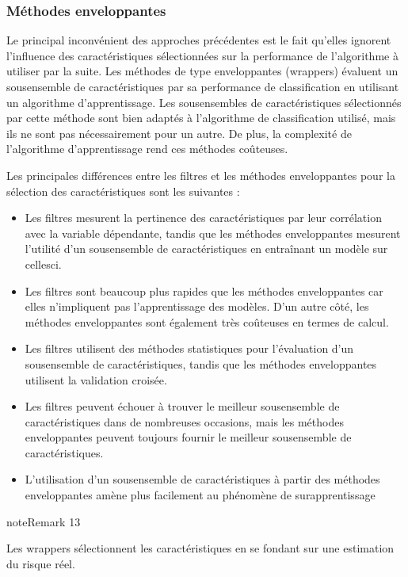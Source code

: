 \documentclass[letterpaper,10pt,french]{sphinxmanual}
\begin{document}
\subsubsection{Méthodes enveloppantes}
\label{\detokenize{selection:methodes-enveloppantes}}
\sphinxAtStartPar
Le principal inconvénient des approches précédentes est le fait qu’elles ignorent l’influence des caractéristiques sélectionnées sur la performance de l’algorithme à utiliser par la suite. Les méthodes de type enveloppantes (wrappers)  évaluent un sous\sphinxhyphen{}ensemble de caractéristiques par sa performance
de classification en utilisant un algorithme d’apprentissage.  Les sous\sphinxhyphen{}ensembles de caractéristiques sélectionnés par cette méthode sont bien adaptés à l’algorithme de classification utilisé, mais ils ne sont pas nécessairement pour un autre. De plus, la complexité de l’algorithme d’apprentissage rend ces méthodes coûteuses.

\sphinxAtStartPar
Les principales différences entre les filtres et les méthodes enveloppantes pour la sélection des caractéristiques sont les suivantes :
\begin{itemize}
\item {} 
\sphinxAtStartPar
Les filtres mesurent la pertinence des caractéristiques par leur corrélation avec la variable dépendante, tandis que les méthodes enveloppantes mesurent l’utilité d’un sous\sphinxhyphen{}ensemble de caractéristiques en entraînant un modèle sur celles\sphinxhyphen{}ci.

\item {} 
\sphinxAtStartPar
Les filtres sont beaucoup plus rapides que les méthodes enveloppantes car elles n’impliquent pas l’apprentissage des modèles. D’un autre côté, les méthodes enveloppantes sont également très coûteuses en termes de calcul.

\item {} 
\sphinxAtStartPar
Les filtres utilisent des méthodes statistiques pour l’évaluation d’un sous\sphinxhyphen{}ensemble de caractéristiques, tandis que les méthodes enveloppantes utilisent la validation croisée.

\item {} 
\sphinxAtStartPar
Les filtres peuvent échouer à trouver le meilleur sous\sphinxhyphen{}ensemble de caractéristiques dans de nombreuses occasions, mais les méthodes enveloppantes peuvent toujours fournir le meilleur sous\sphinxhyphen{}ensemble de caractéristiques.

\item {} 
\sphinxAtStartPar
L’utilisation d’un sous\sphinxhyphen{}ensemble de caractéristiques à partir des méthodes enveloppantes amène plus facilement au phénomène de surapprentissage

\end{itemize}
\label{selection:remark-1}
\begin{sphinxadmonition}{note}{Remark 13}



\sphinxAtStartPar
Les wrappers sélectionnent les caractéristiques en se fondant sur une estimation du risque réel.
\end{sphinxadmonition}
\end{document}
